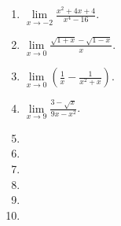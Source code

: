 \begin{multicols}{2}
\begin{enumerate}[ref={\fcProblemRef}]
\item $\displaystyle\lim\limits_{x\to -2} \frac{x^2+4x+4}{x^4-16}$.

\item $\displaystyle\lim\limits_{x\to 0} \frac{\sqrt{1+x}- \sqrt{1-x}}{x}$.

\item $\displaystyle\lim\limits_{x\to 0}\left(\frac{1}x -\frac{1}{x^2+x}\right)$.

\item $\displaystyle\lim\limits_{x\to 9} \frac{3-\sqrt{x}}{9x-x^2}$.

\item 
\item 
\item 

\item 

\item 

\item 

\end{enumerate}
\end{multicols}
